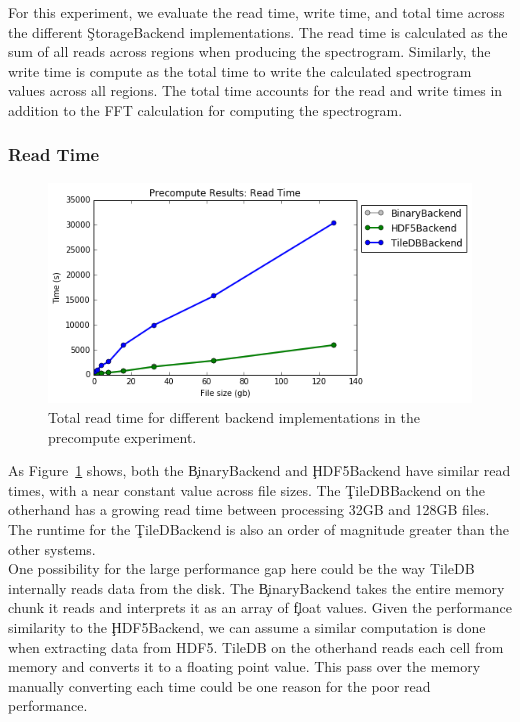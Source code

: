 For this experiment, we evaluate the read time, write time, and total time
across the different \c{StorageBackend} implementations. The read time is
calculated as the sum of all reads across regions when producing the
spectrogram. Similarly, the write time is compute as the total time to write
the calculated spectrogram values across all regions. The total time accounts
for the read and write times in addition to the FFT calculation for computing
the spectrogram.

\subsubsection{Read Time}

\begin{figure}[h]
\begin{center}
\includegraphics[scale=0.75]{./img/precompute-exp-read-time.png}
\caption{Total read time for different backend implementations in the
  precompute experiment.}
\label{fig:precompute-exp-read-time}
\end{center}
\end{figure}

As Figure~\ref{fig:precompute-exp-read-time} shows, both the \c{BinaryBackend}
and \c{HDF5Backend} have similar read times, with a near constant value
across file sizes. The \c{TileDBBackend} on the otherhand has a growing read
time between processing 32GB and 128GB files. The runtime for the
\c{TileDBackend} is also an order of magnitude greater than the other systems. \\

One possibility for the large performance gap here could be the way TileDB
internally reads data from the disk. The \c{BinaryBackend} takes the entire
memory chunk it reads and interprets it as an array of \c{float} values. Given
the performance similarity to the \c{HDF5Backend}, we can assume a similar
computation is done when extracting data from HDF5. TileDB on the otherhand
reads each cell from memory and converts it to a floating point value. This
pass over the memory manually converting each time could be one reason for the
poor read performance.

